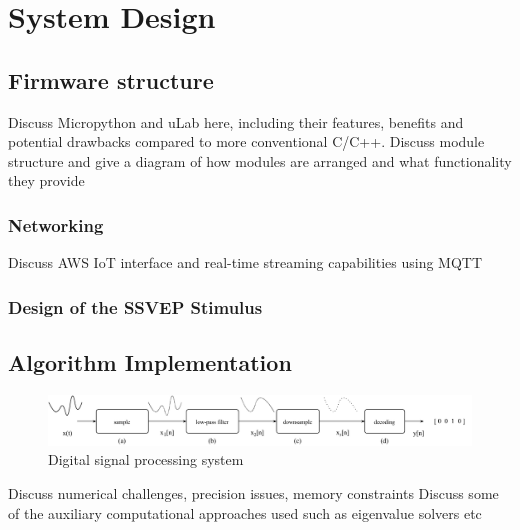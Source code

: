 \chapter{System Design}
\label{chapter:system-design}

\graphicspath{ {report/C5 System Design/assets/} } 

\section{Firmware structure}
Discuss Micropython and uLab here, including their features, benefits and potential drawbacks compared to more conventional C/C++.
Discuss module structure and give a diagram of how modules are arranged and what functionality they provide

\subsection{Networking}
Discuss AWS IoT interface and real-time streaming capabilities using MQTT

\subsection{Design of the SSVEP Stimulus}

\section{Algorithm Implementation}

\begin{figure}
    \centering
    \includegraphics[width=\textwidth]{digital-system}
    \caption{Digital signal processing system}
    \label{fig:digital-system-c5}
\end{figure}

Discuss numerical challenges, precision issues, memory constraints
Discuss some of the auxiliary computational approaches used such as eigenvalue solvers etc

